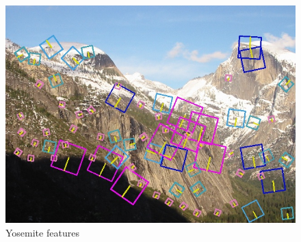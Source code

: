 \documentclass[10pt,twocolumn,letterpaper]{article}
\begin{document}
\begin{figure}[ht!]
\centering
\includegraphics[width=1\textwidth]{img/Yosemite1_features.jpg}
\caption{Yosemite features}
\label{fig:yosemite_feat}
\end{figure}

{\small


}
\end{document}
